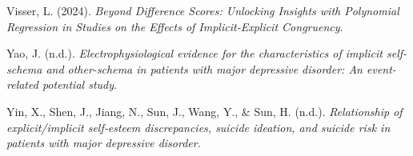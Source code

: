 \documentclass[
  man,
  floatsintext,
  longtable,
  nolmodern,
  notxfonts,
  notimes,
  colorlinks=true,linkcolor=blue,citecolor=blue,urlcolor=blue]{apa7}
\newlength{\cslhangindent}
\newenvironment{CSLReferences}[2] %
 {\begin{list}{}{%
  \setlength{\itemindent}{0pt}
  \setlength{\leftmargin}{0pt}
  \setlength{\parsep}{0pt}
  \ifodd #1
   \setlength{\leftmargin}{\cslhangindent}
   \setlength{\itemindent}{-1\cslhangindent}
  \fi
  \setlength{\itemsep}{#2\baselineskip}}}
 {\end{list}}
\begin{document}
\begin{CSLReferences}{1}{0}
Visser, L. (2024). \emph{Beyond {Difference} {Scores}: {Unlocking}
{Insights} with {Polynomial} {Regression} in {Studies} on the {Effects}
of {Implicit}-{Explicit} {Congruency}}.

Yao, J. (n.d.). \emph{Electrophysiological evidence for the
characteristics of implicit self-schema and other-schema in patients
with major depressive disorder: {An} event-related potential study}.

Yin, X., Shen, J., Jiang, N., Sun, J., Wang, Y., \& Sun, H. (n.d.).
\emph{Relationship of explicit/implicit self‐esteem discrepancies,
suicide ideation, and suicide risk in patients with major depressive
disorder}.

\end{CSLReferences}
\end{document}
